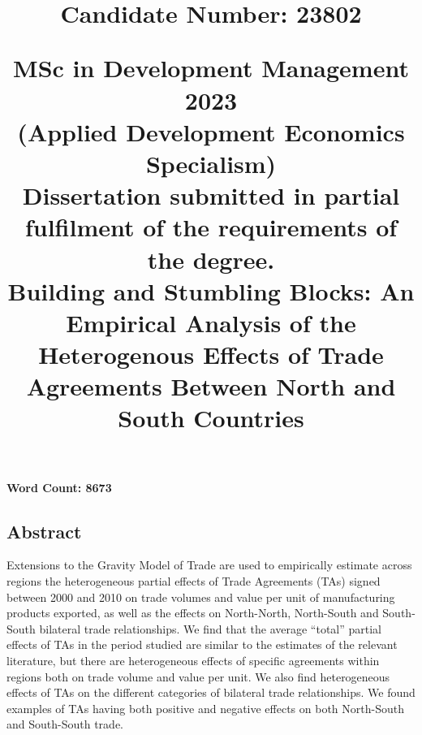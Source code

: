 \documentclass[12pt]{article}%
\title{
        \begin{flushright}
        \large \textbf{Candidate Number: 23802}
        \end{flushright}
        \vspace*{30mm}
        \begin{center}
        \large MSc in Development Management 2023 \\
        \large (Applied Development Economics Specialism) \\
        \vspace*{5mm}
        Dissertation submitted in partial fulfilment of the requirements of the degree. \\
        \vspace*{35mm}
        \large \textbf{Building and Stumbling Blocks: An Empirical Analysis of the Heterogenous Effects of Trade Agreements Between North and South Countries} \\
        \vspace*{20mm}
        \end{center}
    }%
\date{}%
\begin{document}
%
\normalsize%
%
\pagestyle{frontmatter}%
\maketitle%

\vfill
\begin{center}\textbf{Word Count: 8673}\end{center}
\newpage%
\vspace*{\fill}%
\begin{center}%
\begin{minipage}{0.8\textwidth}%
\begin{center}%
\section*{Abstract}%
\end{center}%
\justify%
Extensions to the Gravity Model of Trade are used to empirically estimate across regions the heterogeneous partial effects of Trade Agreements (TAs) signed between 2000 and 2010 on trade volumes and value per unit of manufacturing products exported, as well as the effects on North{-}North, North{-}South and South{-}South bilateral trade relationships. We find that the average “total” partial effects of TAs in the period studied are similar to the estimates of the relevant literature, but there are heterogeneous effects of specific agreements within regions both on trade volume and value per unit. We also find heterogeneous effects of TAs on the different categories of bilateral trade relationships. We found examples of TAs having both positive and negative effects on both North{-}South and South{-}South trade.%
\end{minipage}%
\end{center}%
\vspace*{\fill}%
\newpage%
\tableofcontents%
\newpage%
\end{document}
